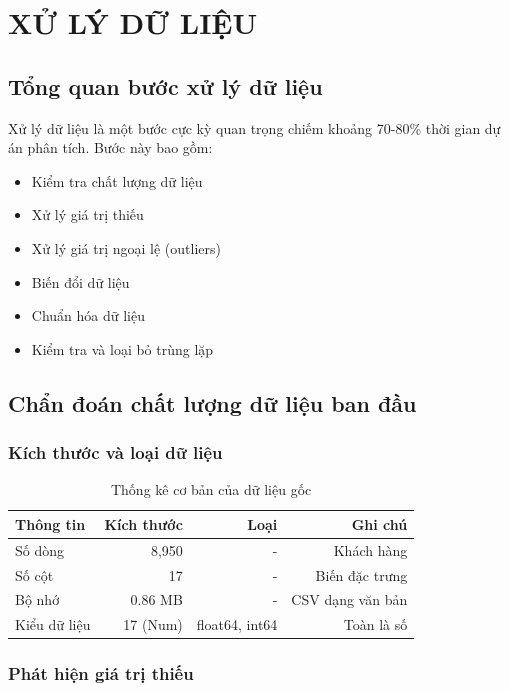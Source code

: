 \chapter{XỬ LÝ DỮ LIỆU}

\section{Tổng quan bước xử lý dữ liệu}

Xử lý dữ liệu là một bước cực kỳ quan trọng chiếm khoảng 70-80\% thời gian dự án phân tích. Bước này bao gồm:

\begin{itemize}
    \item Kiểm tra chất lượng dữ liệu
    \item Xử lý giá trị thiếu
    \item Xử lý giá trị ngoại lệ (outliers)
    \item Biến đổi dữ liệu
    \item Chuẩn hóa dữ liệu
    \item Kiểm tra và loại bỏ trùng lặp
\end{itemize}

\section{Chẩn đoán chất lượng dữ liệu ban đầu}

\subsection{Kích thước và loại dữ liệu}

\begin{table}[H]
\centering
\caption{Thống kê cơ bản của dữ liệu gốc}
\begin{tabular}{|l|r|r|r|}
\hline
\textbf{Thông tin} & \textbf{Kích thước} & \textbf{Loại} & \textbf{Ghi chú} \\
\hline
Số dòng & 8,950 & - & Khách hàng \\
\hline
Số cột & 17 & - & Biến đặc trưng \\
\hline
Bộ nhớ & ~0.86 MB & - & CSV dạng văn bản \\
\hline
Kiểu dữ liệu & 17 (Num) & float64, int64 & Toàn là số \\
\hline
\end{tabular}
\end{table}

\subsection{Phát hiện giá trị thiếu}


